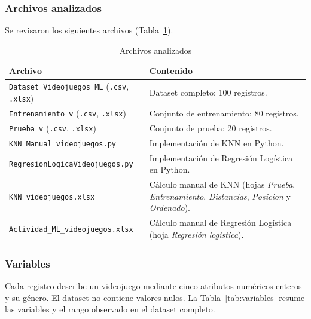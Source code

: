 \documentclass[]{article}
\begin{document}
\subsubsection{Archivos analizados}

Se revisaron los siguientes archivos (Tabla~\ref{tab:archivos}).

\begin{table}[H]
\centering
\small
\caption{Archivos analizados}
\label{tab:archivos}
\begin{tabular}{p{5.6cm} p{9.4cm}}
\toprule
\textbf{Archivo} & \textbf{Contenido} \\
\midrule
\texttt{Dataset\_Videojuegos\_ML} (\texttt{.csv}, \texttt{.xlsx}) & Dataset completo: 100 registros. \\
\texttt{Entrenamiento\_v} (\texttt{.csv}, \texttt{.xlsx}) & Conjunto de entrenamiento: 80 registros. \\
\texttt{Prueba\_v} (\texttt{.csv}, \texttt{.xlsx}) & Conjunto de prueba: 20 registros. \\
\texttt{KNN\_Manual\_videojuegos.py} & Implementación de KNN en Python. \\
\texttt{RegresionLogicaVideojuegos.py} & Implementación de Regresión Logística en Python. \\
\texttt{KNN\_videojuegos.xlsx} & Cálculo manual de KNN (hojas \emph{Prueba}, \emph{Entrenamiento}, \emph{Distancias}, \emph{Posicion} y \emph{Ordenado}). \\
\texttt{Actividad\_ML\_videojuegos.xlsx} & Cálculo manual de Regresión Logística (hoja \emph{Regresión logística}). \\
\bottomrule
\end{tabular}
\end{table}

\subsubsection{Variables}

Cada registro describe un videojuego mediante cinco atributos numéricos enteros y su género. El dataset no contiene valores nulos. La Tabla~\ref{tab:variables} resume las variables y el rango observado en el dataset completo.
\end{document}

